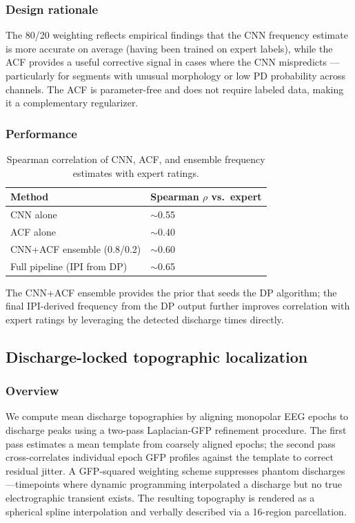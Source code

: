 \subsubsection{Design rationale}

The 80/20 weighting reflects empirical findings that the CNN frequency estimate is more accurate on average (having been trained on expert labels), while the ACF provides a useful corrective signal in cases where the CNN mispredicts --- particularly for segments with unusual morphology or low PD probability across channels. The ACF is parameter-free and does not require labeled data, making it a complementary regularizer.

\subsubsection{Performance}

\begin{table}[h]
\centering
\caption{Spearman correlation of CNN, ACF, and ensemble frequency estimates with expert ratings.}
\label{tab:cnn_acf_perf}
\begin{tabular}{ll}
\hline
Method & Spearman $\rho$ vs.\ expert \\
\hline
CNN alone & $\sim$0.55 \\
ACF alone & $\sim$0.40 \\
CNN+ACF ensemble (0.8/0.2) & $\sim$0.60 \\
Full pipeline (IPI from DP) & $\sim$0.65 \\
\hline
\end{tabular}
\end{table}

The CNN+ACF ensemble provides the prior that seeds the DP algorithm; the final IPI-derived frequency from the DP output further improves correlation with expert ratings by leveraging the detected discharge times directly.

\subsection{Discharge-locked topographic localization}
\label{app:discharge_topo}

\subsubsection{Overview}

We compute mean discharge topographies by aligning monopolar EEG epochs to discharge peaks using a two-pass Laplacian-GFP refinement procedure. The first pass estimates a mean template from coarsely aligned epochs; the second pass cross-correlates individual epoch GFP profiles against the template to correct residual jitter. A GFP-squared weighting scheme suppresses phantom discharges---timepoints where dynamic programming interpolated a discharge but no true electrographic transient exists. The resulting topography is rendered as a spherical spline interpolation and verbally described via a 16-region parcellation.

